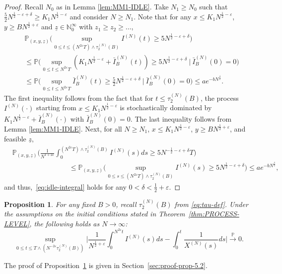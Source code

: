 \documentclass[11pt, reqno]{article}
\newtheorem{prop}[theorem]{Proposition}
\numberwithin{equation}{section}
\numberwithin{theorem}{section}
\newcommand{\pto}{\ensuremath{\xrightarrow{\ \mathbb{P}\ }}}  %
\begin{document}
\begin{proof}
Recall $N_0$ as in Lemma \ref{lem:MM1-IDLE}.
Take $N_1 \ge N_0$ such that $\frac{5}{2}N^{\frac{1}{2}-\varepsilon+\delta}\geq K_1 N^{\frac{1}{2}-\varepsilon}$ and consider $N\geq N_1$. Note that for any $x\leq K_1N^{\frac{1}{2}-\varepsilon}$, $y\geq B N^{\frac{1}{2}+\varepsilon}$ and $\underline{z} \in \mathbb{N}_0^{\infty}$ with $z_1 \ge z_2 \ge \dots$,
\begin{align*}
    &\mathbb{P}_{(x, y, \underline{z})}\Big(\sup_{0\leq t\leq (N^{2\varepsilon}T)\wedge\tau^{(N)}_2(B)}I^{(N)}(t)\geq 5N^{\frac{1}{2}-\varepsilon+\delta}\Big)\\
    &\leq \mathbb{P}\Big(\sup_{0\leq t\leq N^{2\varepsilon}T}\left(K_1N^{\frac{1}{2}-\varepsilon} + \bar{I}^{(N)}_B(t)\right)\geq 5N^{\frac{1}{2}-\varepsilon+\delta}\ \big|\ \bar{I}^{(N)}_B(0)=0\Big)\\
   &\leq \mathbb{P}\Big(\sup_{0\leq t\leq N^{2\varepsilon}T}\bar{I}^{(N)}_B(t)\geq \frac{5}{2}N^{\frac{1}{2}-\varepsilon+\delta}\ \big|\ \bar{I}^{(N)}_B(0)=0\Big)
    \leq ae^{-bN^{\frac{\delta}{2}}}.
\end{align*}
The first inequality follows from the fact that for $t \le \tau^{(N)}_2(B)$, the process $I^{(N)}(\cdot)$ starting from $x \le K_1N^{\frac{1}{2}-\varepsilon}$ is stochastically dominated by $K_1N^{\frac{1}{2}-\varepsilon} + \bar I^{(N)}_B(\cdot)$ with $\bar I^{(N)}_B(0)=0$. The last inequality follows from Lemma \ref{lem:MM1-IDLE}.
Next, for all $N\geq N_1$, $x\leq K_1N^{\frac{1}{2}-\varepsilon}$, $y\geq B N^{\frac{1}{2}+\varepsilon}$, and feasible $\underline{z}$,
\begin{align*}
    &\mathbb{P}_{(x, y, \underline{z})}\Big(\frac{1}{N^{1+2\varepsilon}}\int_0^{(N^{2\varepsilon}T)\wedge\tau^{(N)}_2(B)} I^{(N)}(s)ds\geq 5N^{-\frac{1}{2}-\varepsilon+\delta}T\Big)\\
    &\hspace{3cm}\quad\leq \mathbb{P}_{(x, y, \underline{z})}\Big(\sup_{0\leq s\leq (N^{2\varepsilon}T)\wedge\tau^{(N)}_2(B)}I^{(N)}(s)\geq 5N^{\frac{1}{2}-\varepsilon+\delta}\Big)\leq ae^{-bN^{\frac{\delta}{2}}},
\end{align*}
and thus,~\eqref{eq:idle-integral} holds for any $0 < \delta < \frac{1}{2}+\varepsilon$. 
\end{proof}


\begin{prop}\label{prop:INT-IDLE-2}
For any fixed $B>0$, recall $\tau^{(N)}_2(B)$ from \eqref{eq:tau-def}.  Under the assumptions on the initial conditions stated in Theorem~\ref{thm:PROCESS-LEVEL}, the following holds as $N\to\infty$:
$$\sup_{0\leq t\leq T\wedge(N^{-2\varepsilon}\tau^{(N)}_2(B))}\Big|\frac{1}{N^{\frac{1}{2}+\varepsilon}}\int_0^{N^{2\varepsilon}t}I^{(N)}(s)ds-\int_0^t \frac{1}{X^{(N)}(s)}ds\Big|\pto 0.$$
\end{prop}
The proof of Proposition~\ref{prop:INT-IDLE-2} is given in Section~\ref{sec:proof-prop-5.2}.
\end{document}
